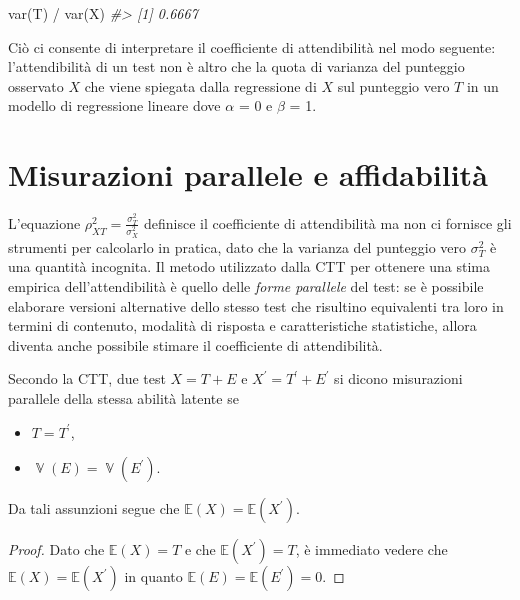 \documentclass[
  11pt,
]{krantz}
\makeatletter
\newenvironment{Shaded}{\begin{snugshade}}{\end{snugshade}}
\newcommand{\CommentTok}[1]{\textcolor[rgb]{0.37,0.37,0.37}{\textit{#1}}}
\newcommand{\FunctionTok}[1]{\textcolor[rgb]{0,0,0}{#1}}
\newcommand{\NormalTok}[1]{#1}
\newcommand{\SpecialCharTok}[1]{\textcolor[rgb]{0,0,0}{#1}}
\providecommand{\tightlist}{%
  \setlength{\itemsep}{0pt}\setlength{\parskip}{0pt}}
\newenvironment{kframe}{%
\medskip{}
\setlength{\fboxsep}{.8em}
 \def\at@end@of@kframe{}%
 \ifinner\ifhmode%
  \def\at@end@of@kframe{\end{minipage}}%
  \begin{minipage}{\columnwidth}%
 \fi\fi%
 \def\FrameCommand##1{\hskip\@totalleftmargin \hskip-\fboxsep
 \colorbox{shadecolor}{##1}\hskip-\fboxsep
     \hskip-\linewidth \hskip-\@totalleftmargin \hskip\columnwidth}%
 \MakeFramed {\advance\hsize-\width
   \@totalleftmargin\z@ \linewidth\hsize
   \@setminipage}}%
 {\par\unskip\endMakeFramed%
 \at@end@of@kframe}
\renewenvironment{Shaded}{\begin{kframe}}{\end{kframe}}
\DeclareMathOperator{\V}{\mathbb{V}} %
\newcommand{\E}{\mathbb{E}} %
\theoremstyle{definition}
\theoremstyle{definition}
\theoremstyle{definition}
\theoremstyle{definition}
\theoremstyle{remark}
\makeatother
\begin{document}
\begin{Shaded}
\begin{Highlighting}[]
\FunctionTok{var}\NormalTok{(T) }\SpecialCharTok{/} \FunctionTok{var}\NormalTok{(X)}
\CommentTok{\#\textgreater{} [1] 0.6667}
\end{Highlighting}
\end{Shaded}

Ciò ci consente di interpretare il coefficiente di attendibilità nel modo seguente: l'attendibilità di un test non è altro che la quota di varianza del punteggio osservato \(X\) che viene spiegata dalla regressione di \(X\) sul punteggio vero \(T\) in un modello di regressione lineare dove \(\alpha\) = 0 e \(\beta\) = 1.

\hypertarget{misurazioni-parallele-e-affidabilituxe0}{%
\section{Misurazioni parallele e affidabilità}\label{misurazioni-parallele-e-affidabilituxe0}}

L'equazione \(\rho_{XT}^2 = \frac{\sigma_{T}^2}{\sigma_X^2}\) definisce il coefficiente di attendibilità ma non ci fornisce gli strumenti per calcolarlo in pratica, dato che la varianza del punteggio vero \(\sigma_{T}^2\) è una quantità incognita. Il metodo utilizzato dalla CTT per ottenere una stima empirica dell'attendibilità è quello delle \emph{forme parallele} del test: se è possibile elaborare versioni alternative dello stesso test che risultino equivalenti tra loro in termini di contenuto, modalità di risposta e caratteristiche statistiche, allora diventa anche possibile stimare il coefficiente di attendibilità.

Secondo la CTT, due test \(X=T+E\) e \(X^\prime=T^\prime+E^\prime\) si dicono misurazioni parallele della stessa abilità latente se

\begin{itemize}
\tightlist
\item
  \(T = T^\prime\),
\item
  \(\V(E) = \V(E^\prime)\).
\end{itemize}

Da tali assunzioni segue che \(\E(X) = \E(X^\prime)\).

\begin{proof}
Dato che \(\E(X) = T\) e che \(\E(X^\prime) = T\), è immediato vedere che \(\E(X) =\E(X^\prime)\) in quanto \(\E(E) = \E(E^\prime) = 0\).
\end{proof}
\end{document}
